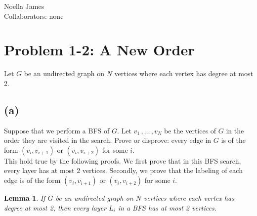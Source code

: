 \documentclass{article}
\theoremstyle{definition}
\theoremstyle{remark}
\theoremstyle{plain}
\newtheorem{lem}[thm]{Lemma}
\begin{document}
Noella James\\
Collaborators: none\\

\section{Problem 1-2: A New Order}

Let $G$ be an undirected graph on $N$ vertices where each vertex has degree at most 2.\\

\subsection{(a)}

Suppose that we perform a BFS of $G$. Let $v_1\,, \dots \,,v_N$ be the vertices of $G$ in the order they are visited in the search. Prove or disprove: every edge in $G$ is of the form $(v_i, v_{i+1})$ or $(v_i, v_{i+2})$ for some $i$.\\

This hold true by the following proofs. We first prove that in this BFS search, every layer has at most 2 vertices. Secondly, we prove that the labeling of each edge is of the form $(v_i, v_{i+1})$ or $(v_i, v_{i+2})$ for some $i$.

\begin{lem}
If $G$ be an undirected graph on $N$ vertices where each vertex has degree at most 2, then every layer $L_i$ in a BFS has at most 2 vertices.
\end{lem}
\end{document}
